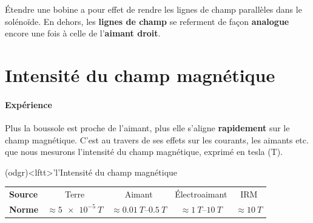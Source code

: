 \documentclass[../../main/main.tex]{subfiles}
\begin{document}

Étendre une bobine a pour effet de rendre les lignes de champ parallèles dans le
solénoïde. En dehors, les \textbf{lignes de champ} se referment de façon
\textbf{analogue} encore une fois à celle de l'\textbf{aimant droit}.

\section{Intensité du champ magnétique}
\label{sec:intchp}
\paragraph*{Expérience} Plus la boussole est proche de l'aimant, plus elle
s'aligne \textbf{rapidement} sur le champ magnétique. C'est au travers de ses
effets sur les courants, les aimants etc. que nous mesurons l'intensité du champ
magnétique, exprimé en tesla (\si{T}).
\begin{tcb*}(odgr)<lftt>'l'{Intensité du champ magnétique}
  \begin{center}
    \begin{tabular}{lcccc}
      \toprule
      \textbf{Source}
      &
      Terre
      &
      Aimant
      &
      Électroaimant
      &
      IRM
      \\
      \textbf{Norme}
      &
      $ \approx \SI{5e-5}{T} $
      &
      $ \approx \SIrange{0.01}{0.5}{T} $
      &
      $ \approx \SIrange{1}{10}{T} $
      &
      $ \approx \SI{10}{T} $
      \\
      \bottomrule
    \end{tabular}
  \end{center}
\end{tcb*}
\end{document}
